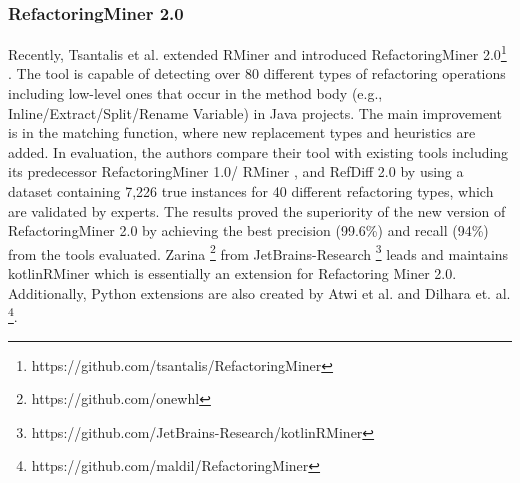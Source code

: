 \documentclass[letterpaper,12pt,onecolumn,final]{report}
\begin{document}
\subsubsection{RefactoringMiner 2.0}
Recently, Tsantalis et al. extended RMiner \cite{Tsantalis2018} and introduced RefactoringMiner 2.0\footnote{https://github.com/tsantalis/RefactoringMiner} \cite{Tsantalis2020}. The tool is capable of detecting over 80 different types of refactoring operations including low-level ones that occur in the method body (e.g., Inline/Extract/Split/Rename Variable) in Java projects. The main improvement is in the matching function, where new replacement types and heuristics are added. In evaluation, the authors compare their tool with existing tools including its predecessor RefactoringMiner 1.0/ RMiner \cite{Tsantalis2018}, and RefDiff 2.0 \cite{Silva2020} by using a dataset containing 7,226 true instances for 40 different refactoring types, which are validated by experts. The results proved the superiority of the new version of RefactoringMiner 2.0 by achieving the best precision (99.6\%) and recall (94\%) from the tools evaluated. Zarina \footnote{https://github.com/onewhl} from JetBrains-Research \footnote{https://github.com/JetBrains-Research/kotlinRMiner} leads and maintains kotlinRMiner which is essentially an extension for Refactoring Miner 2.0. Additionally, Python extensions are also created by Atwi et al. \cite{Atwi2021} and Dilhara et. al. \footnote{https://github.com/maldil/RefactoringMiner}.
\end{document}
